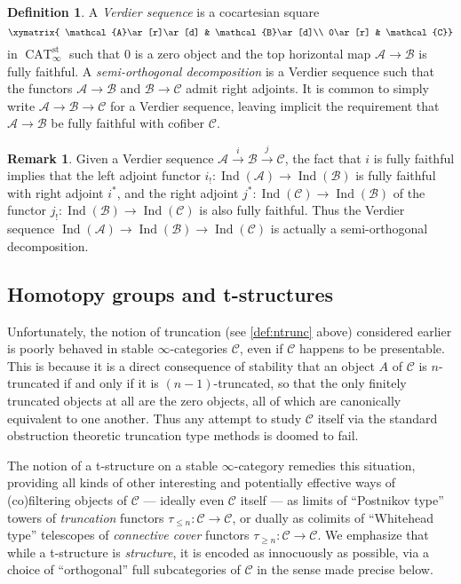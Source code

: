 \documentclass{article}
\theoremstyle{definition}
\newtheorem{definition}{Definition}[subsection]
\newtheorem{remark}{Remark}[subsection]
\newcommand{\A}{\mathcal{A}}
\newcommand{\B}{\mathcal{B}}
\newcommand{\C}{\mathcal{C}}
\renewcommand{\i}{\infty}
\DeclareMathOperator{\CAT}{CAT}
\DeclareMathOperator{\Ind}{Ind}
\begin{document}
\begin{definition}
A {\em Verdier sequence}
is a cocartesian square
\[
\xymatrix{
\A\ar[r]\ar[d] & \B\ar[d]\\
0\ar[r] & \C}
\]
in $\CAT_\i^\mathrm{st}$ such that $0$ is a zero object and the top horizontal map $\A\to\B$ is fully faithful.
A {\em semi-orthogonal decomposition}
is a Verdier sequence such that the functors $\A\to\B$ and $\B\to\C$ admit right adjoints.
It is common to simply write $\A\to\B\to\C$ for a Verdier sequence, leaving implicit the requirement that $\A\to\B$ be fully faithful with cofiber $\C$.
\end{definition}


\begin{remark} 
Given a Verdier sequence $\A\overset{i}\to\B\overset{j}{\to}\C$, the fact that $i$ is fully faithful implies that the left adjoint functor $i_!:\Ind(\A)\to\Ind(\B)$ is fully faithful with right adjoint $i^*$, and the right adjoint $j^*:\Ind(\C)\to\Ind(\B)$ of the functor $j_!:\Ind(\B)\to\Ind(\C)$ is also fully faithful.
Thus the Verdier sequence $\Ind(\A)\to\Ind(\B)\to\Ind(\C)$ is actually a semi-orthogonal decomposition.
\end{remark}

\subsection{Homotopy groups and t-structures}

Unfortunately, the notion of truncation (see \autoref{def:ntrunc} above) considered earlier is poorly behaved in stable $\i$-categories $\C$, even if $\C$ happens to be presentable.
This is because it is a direct consequence of stability that an object $A$ of $\C$ is $n$-truncated if and only if it is $(n-1)$-truncated, so that the only finitely truncated objects at all are the zero objects, all of which are canonically equivalent to one another.
Thus any attempt to study $\C$ itself via the standard obstruction theoretic truncation type methods is doomed to fail.

The notion of a t-structure on a stable $\i$-category remedies this situation, providing all kinds of other interesting and potentially effective ways of (co)filtering objects of $\C$ --- ideally even $\C$ itself --- as limits of ``Postnikov type'' towers of {\em truncation} functors $\tau_{\leq n}:\C\to\C$, or dually as colimits of ``Whitehead type'' telescopes of {\em connective cover} functors $\tau_{\geq n}:\C\to\C$.
We emphasize that while a t-structure is {\em structure}, it is encoded as innocuously as possible, via a choice of ``orthogonal'' full subcategories of $\C$ in the sense made precise below.
\end{document}
